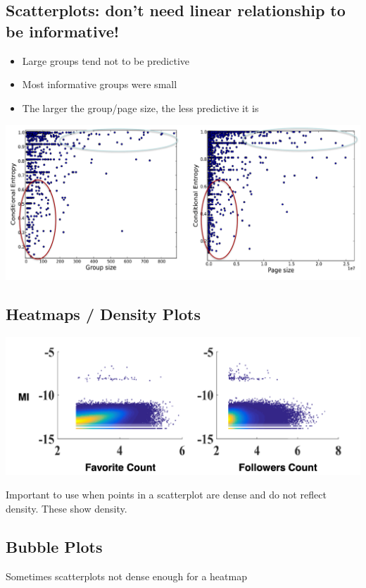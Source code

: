 \documentclass[11pt]{article}
\theoremstyle{definition}
\begin{document}
\subsection{Scatterplots: don’t need linear relationship to
be informative!}
\begin{itemize}
  \item Large groups tend not to be predictive
  \item Most informative groups were small
  \item The larger the group/page size, the less predictive it is
\end{itemize}
\includegraphics[width=\textwidth]{25.png}

\subsection{Heatmaps / Density Plots}
\includegraphics[width=\textwidth]{26.png}

Important to use when points in a scatterplot
are dense and do not reflect density. These show density.

\subsection{Bubble Plots}
Sometimes scatterplots not
dense enough for a heatmap
\end{document}
